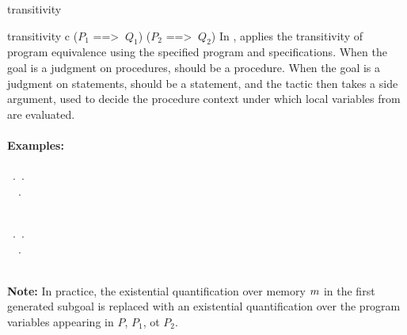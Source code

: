 \begin{tactic}{transitivity}
  \begin{tsyntax}{transitivity c ($P_1$ ==> $\ Q_1$) ($P_2$ ==> $\ Q_2$)}
  In \prhl, applies the transitivity of program equivalence using the
  specified program and specifications. When the goal is a judgment on
  procedures,  should be a procedure. When the goal is a
  judgment on statements,  should be a statement, and the
  tactic then takes a side argument, used to decide the procedure
  context under which local variables from  are evaluated.

  \paragraph{Examples:}\strut

  \begin{cmathpar}
    {\forall {}\ .\,    \Rightarrow
        \exists {}.\,   
                           \wedge {}   \\
     \forall {}\ \ .\,
           \Rightarrow
             \Rightarrow
             \\
      \\
     }
    {}

    {\forall {}\ .\,    \Rightarrow
        \exists {}.\,   
                           \wedge {}   \\
     \forall {}\ \ .\,
           \Rightarrow
             \Rightarrow
             \\
      \\
     }
    {}
  \end{cmathpar}

  \textbf{Note:} In practice, the existential quantification over
  memory $m$ in the first generated subgoal is replaced with an
  existential quantification over the program variables appearing in $P$,
  $P_1$, ot $P_2$.
  \end{tsyntax}
\end{tactic}
